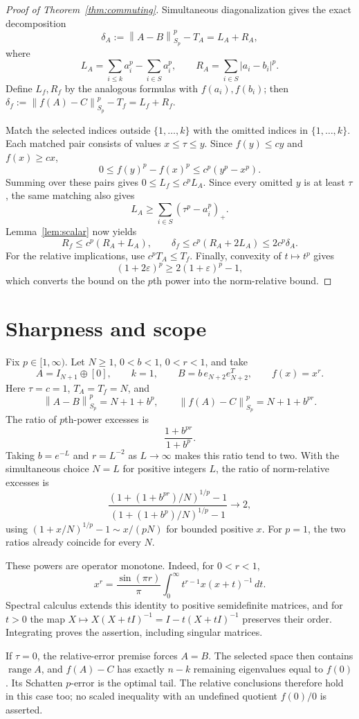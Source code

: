 \documentclass[11pt]{article}
\theoremstyle{definition}
\newcommand{\range}{\operatorname{range}}
\newcommand{\norm}[1]{\left\lVert#1\right\rVert}
\newcommand{\eps}{\varepsilon}
\begin{document}
\begin{proof}[Proof of Theorem~\ref{thm:commuting}]
Simultaneous diagonalization gives the exact decomposition
\[
 \delta_A:=\norm{A-B}_{S_p}^p-T_A=L_A+R_A,
\]
where
\[
 L_A=\sum_{i\le k}a_i^p-\sum_{i\in S}a_i^p,\qquad
 R_A=\sum_{i\in S}|a_i-b_i|^p.
\]
Define $L_f,R_f$ by the analogous formulas with $f(a_i),f(b_i)$; then
$\delta_f:=\norm{f(A)-C}_{S_p}^p-T_f=L_f+R_f$.

Match the selected indices outside $\{1,\ldots,k\}$ with the omitted indices in $\{1,\ldots,k\}$. Each matched pair consists of values $x\le\tau\le y$. Since $f(y)\le cy$ and $f(x)\ge cx$,
\[
 0\le f(y)^p-f(x)^p\le c^p(y^p-x^p).
\]
Summing over these pairs gives $0\le L_f\le c^pL_A$. Since every omitted $y$ is at least $\tau$, the same matching also gives
\[
 L_A\ge\sum_{i\in S}(\tau^p-a_i^p)_+.
\]
Lemma~\ref{lem:scalar} now yields
\[
 R_f\le c^p(R_A+L_A),
 \qquad
 \delta_f\le c^p(R_A+2L_A)\le2c^p\delta_A.
\]
For the relative implications, use $c^pT_A\le T_f$. Finally, convexity of $t\mapsto t^p$ gives
\[
 (1+2\eps)^p\ge2(1+\eps)^p-1,
\]
which converts the bound on the $p$th power into the norm-relative bound.
\end{proof}

\section{Sharpness and scope}
Fix $p\in[1,\infty)$. Let $N\ge1$, $0<b<1$, $0<r<1$, and take
\[
 A=I_{N+1}\oplus[0],\qquad k=1,\qquad
 B=b\,e_{N+2}e_{N+2}^T,\qquad f(x)=x^r.
\]
Here $\tau=c=1$, $T_A=T_f=N$, and
\[
 \norm{A-B}_{S_p}^p=N+1+b^p,\qquad
 \norm{f(A)-C}_{S_p}^p=N+1+b^{pr}.
\]
The ratio of $p$th-power excesses is
\[
 \frac{1+b^{pr}}{1+b^p}.
\]
Taking $b=e^{-L}$ and $r=L^{-2}$ as $L\to\infty$ makes this ratio tend to two. With the simultaneous choice $N=L$ for positive integers $L$, the ratio of norm-relative excesses is
\[
 \frac{(1+(1+b^{pr})/N)^{1/p}-1}
 {(1+(1+b^p)/N)^{1/p}-1}\longrightarrow2,
\]
using $(1+x/N)^{1/p}-1\sim x/(pN)$ for bounded positive $x$. For $p=1$, the two ratios already coincide for every $N$.

These powers are operator monotone. Indeed, for $0<r<1$,
\[
 x^r=\frac{\sin(\pi r)}{\pi}
 \int_0^\infty t^{r-1}x(x+t)^{-1}\,dt.
\]
Spectral calculus extends this identity to positive semidefinite matrices, and for $t>0$ the map
$X\mapsto X(X+tI)^{-1}=I-t(X+tI)^{-1}$ preserves their order. Integrating proves the assertion, including singular matrices.

If $\tau=0$, the relative-error premise forces $A=B$. The selected space then contains $\range A$, and $f(A)-C$ has exactly $n-k$ remaining eigenvalues equal to $f(0)$. Its Schatten $p$-error is the optimal tail. The relative conclusions therefore hold in this case too; no scaled inequality with an undefined quotient $f(0)/0$ is asserted.
\end{document}
